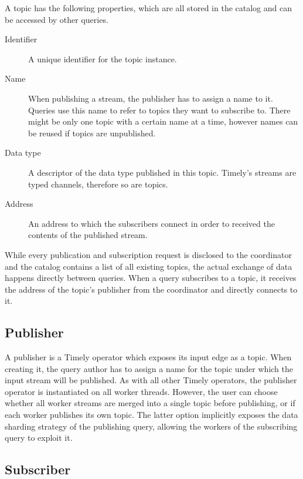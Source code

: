 A topic has the following properties, which are all stored in the catalog
and can be accessed by other queries.
\begin{description}
\item [Identifier] A unique identifier for the topic instance.
\item [Name] When publishing a stream, the publisher has to assign a name to it.
Queries use this name to refer to topics they want to subscribe to. There might
be only one topic with a certain name at a time, however names can be reused if
topics are unpublished.
\item [Data type] A descriptor of the data type published in this topic. Timely's
streams are typed channels, therefore so are topics.
\item [Address] An address to which the subscribers connect in order to received
the contents of the published stream.
\end{description}

While every publication and subscription request is disclosed to the coordinator
and the catalog contains a list of all existing topics, the
actual exchange of data happens directly between queries. When a query subscribes
to a topic, it receives the address of the topic's publisher from the coordinator
and directly connects to it.

\subsection{Publisher}

A publisher is a Timely operator which exposes its input edge as a topic. When
creating it, the query author has to assign a name for the topic under which the
input stream will be published. As with all other Timely operators, the publisher
operator is instantiated on all worker threads. However, the user can choose
whether all worker streams are merged into a single topic before publishing, or
if each worker publishes its own topic. The latter option implicitly exposes
the data sharding strategy of the publishing query, allowing the workers of
the subscribing query to exploit it.



\subsection{Subscriber}


